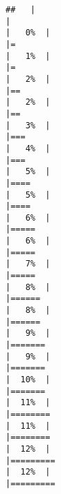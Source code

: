 \documentclass[
]{book}
\begin{document}
\begin{verbatim}
##   |                                                                              |                                                                      |   0%  |                                                                              |=                                                                     |   1%  |                                                                              |=                                                                     |   2%  |                                                                              |==                                                                    |   2%  |                                                                              |==                                                                    |   3%  |                                                                              |===                                                                   |   4%  |                                                                              |===                                                                   |   5%  |                                                                              |====                                                                  |   5%  |                                                                              |====                                                                  |   6%  |                                                                              |=====                                                                 |   6%  |                                                                              |=====                                                                 |   7%  |                                                                              |=====                                                                 |   8%  |                                                                              |======                                                                |   8%  |                                                                              |======                                                                |   9%  |                                                                              |=======                                                               |   9%  |                                                                              |=======                                                               |  10%  |                                                                              |=======                                                               |  11%  |                                                                              |========                                                              |  11%  |                                                                              |========                                                              |  12%  |                                                                              |=========                                                             |  12%  |                                                                              |========= 
\end{verbatim}
\end{document}
